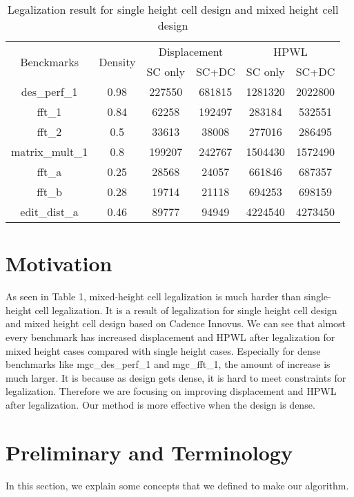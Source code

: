 \documentclass[sigconf,authordraft]{acmart}
\begin{document}
\begin{table}
\caption{Legalization result for single height cell design and mixed height cell design}
\centering
\begin{tabular}{|c|c|cc|cc|}
\hline
\multirow{2}{*}{Benckmarks} & 
\multirow{2}{*}{Density} & 
\multicolumn{2}{c|}{Displacement} &
\multicolumn{2}{c|}{HPWL} \\
 &   & SC only & SC+DC & SC only & SC+DC     \\ 
\hline
des\_perf\_1    & 0.98   & 227550 & 681815 & 1281320 & 2022800  \\
\hline
fft\_1          & 0.84   & 62258  & 192497  & 283184 & 532551  \\
\hline
fft\_2          & 0.5    & 33613  & 38008   & 277016 & 286495   \\
\hline
matrix\_mult\_1 & 0.8    & 199207 & 242767  & 1504430 & 1572490  \\
\hline
fft\_a          & 0.25   & 28568  & 24057  & 661846 & 687357  \\
\hline
fft\_b          & 0.28   & 19714  & 21118  & 694253 & 698159   \\
\hline
edit\_dist\_a   & 0.46   & 89777  & 94949 & 4224540 & 4273450 \\
\hline
\end{tabular}
\end{table}

\section{Motivation}
As seen in Table 1, mixed-height cell legalization is much harder than single-height cell legalization. It is a result of legalization for single height cell design and mixed height cell design based on Cadence Innovus. We can see that almost every benchmark has increased displacement and HPWL after legalization for mixed height cases compared with single height cases. Especially for dense benchmarks like mgc\_des\_perf\_1 and mgc\_fft\_1, the amount of increase is much larger.
It is because as design gets dense, it is hard to meet constraints for legalization. 
Therefore we are focusing on improving displacement and HPWL after legalization. 
Our method is more effective when the design is dense.


\section{Preliminary and Terminology}
In this section, we explain some concepts that we defined to make our algorithm.
\end{document}
